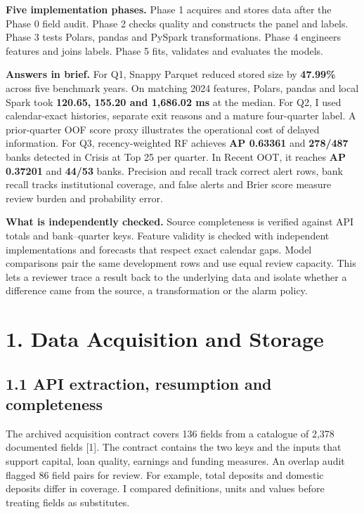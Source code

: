 \documentclass[
  12pt,
  a4paper,
]{article}
\renewcommand{\arraystretch}{1.16}
\begin{document}
\textbf{Five implementation phases.} Phase 1 acquires and stores data
after the Phase 0 field audit. Phase 2 checks quality and constructs the
panel and labels. Phase 3 tests Polars, pandas and PySpark
transformations. Phase 4 engineers features and joins labels. Phase 5
fits, validates and evaluates the models.

\textbf{Answers in brief.} For Q1, Snappy Parquet reduced stored size by
\textbf{47.99\%} across five benchmark years. On matching 2024 features,
Polars, pandas and local Spark took \textbf{120.65, 155.20 and 1,686.02
ms} at the median. For Q2, I used calendar-exact histories, separate
exit reasons and a mature four-quarter label. A prior-quarter OOF score
proxy illustrates the operational cost of delayed information. For Q3,
recency-weighted RF achieves \textbf{AP 0.63361} and \textbf{278/487}
banks detected in Crisis at Top 25 per quarter. In Recent OOT, it
reaches \textbf{AP 0.37201} and \textbf{44/53} banks. Precision and
recall track correct alert rows, bank recall tracks institutional
coverage, and false alerts and Brier score measure review burden and
probability error.

\textbf{What is independently checked.} Source completeness is verified
against API totals and bank--quarter keys. Feature validity is checked
with independent implementations and forecasts that respect exact
calendar gaps. Model comparisons pair the same development rows and use
equal review capacity. This lets a reviewer trace a result back to the
underlying data and isolate whether a difference came from the source, a
transformation or the alarm policy.

\newpage
\setlength{\parskip}{2.9pt plus .55pt minus .3pt}
\renewcommand{\arraystretch}{1.10}
\fontsize{10pt}{12.77pt}\selectfont

\section{1. Data Acquisition and
Storage}\label{data-acquisition-and-storage}

\subsection{1.1 API extraction, resumption and
completeness}\label{api-extraction-resumption-and-completeness}

The archived acquisition contract covers 136 fields from a catalogue of
2,378 documented fields {[}1{]}. The contract contains the two keys and
the inputs that support capital, loan quality, earnings and funding
measures. An overlap audit flagged 86 field pairs for review. For
example, total deposits and domestic deposits differ in coverage. I
compared definitions, units and values before treating fields as
substitutes.
\end{document}
